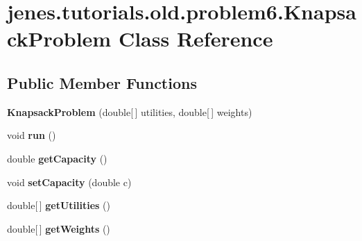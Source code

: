 \hypertarget{classjenes_1_1tutorials_1_1old_1_1problem6_1_1_knapsack_problem}{\section{jenes.\-tutorials.\-old.\-problem6.\-Knapsack\-Problem Class Reference}
\label{classjenes_1_1tutorials_1_1old_1_1problem6_1_1_knapsack_problem}
}
\subsection*{Public Member Functions}
\begin{DoxyCompactItemize}
\item 
\hypertarget{classjenes_1_1tutorials_1_1old_1_1problem6_1_1_knapsack_problem_a98ced3e27ae818b37a2a3eb0049d6e85}{{\bfseries Knapsack\-Problem} (double\mbox{[}$\,$\mbox{]} utilities, double\mbox{[}$\,$\mbox{]} weights)}\label{classjenes_1_1tutorials_1_1old_1_1problem6_1_1_knapsack_problem_a98ced3e27ae818b37a2a3eb0049d6e85}

\item 
\hypertarget{classjenes_1_1tutorials_1_1old_1_1problem6_1_1_knapsack_problem_adbb69b885007d3726fc810356eac67c0}{void {\bfseries run} ()}\label{classjenes_1_1tutorials_1_1old_1_1problem6_1_1_knapsack_problem_adbb69b885007d3726fc810356eac67c0}

\item 
\hypertarget{classjenes_1_1tutorials_1_1old_1_1problem6_1_1_knapsack_problem_abd6659702b32915c9b2a5a6666f1dc48}{double {\bfseries get\-Capacity} ()}\label{classjenes_1_1tutorials_1_1old_1_1problem6_1_1_knapsack_problem_abd6659702b32915c9b2a5a6666f1dc48}

\item 
\hypertarget{classjenes_1_1tutorials_1_1old_1_1problem6_1_1_knapsack_problem_aecba52f753029fdda23b07cf2242f924}{void {\bfseries set\-Capacity} (double c)}\label{classjenes_1_1tutorials_1_1old_1_1problem6_1_1_knapsack_problem_aecba52f753029fdda23b07cf2242f924}

\item 
\hypertarget{classjenes_1_1tutorials_1_1old_1_1problem6_1_1_knapsack_problem_a128edb3ce375d4f9198e4c8373efb183}{double\mbox{[}$\,$\mbox{]} {\bfseries get\-Utilities} ()}\label{classjenes_1_1tutorials_1_1old_1_1problem6_1_1_knapsack_problem_a128edb3ce375d4f9198e4c8373efb183}

\item 
\hypertarget{classjenes_1_1tutorials_1_1old_1_1problem6_1_1_knapsack_problem_ab14674173825d76b3fb45b0a7e4f664e}{double\mbox{[}$\,$\mbox{]} {\bfseries get\-Weights} ()}\label{classjenes_1_1tutorials_1_1old_1_1problem6_1_1_knapsack_problem_ab14674173825d76b3fb45b0a7e4f664e}

\end{DoxyCompactItemize}
